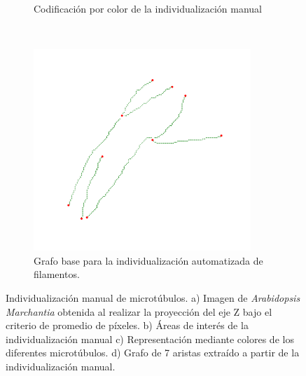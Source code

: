 \begin{figure}[h!]
\begin{subfigure}[t]{0.49\textwidth}
        \caption{Codificaci\'on por color de la individualizaci\'on manual}
        \label{fig:field3t0filtered2-indivManual}
    \end{subfigure}
    ~
    \begin{subfigure}[t]{0.49\textwidth}
        \centering
        \includegraphics[height=3in]{benchImages/field3-t0-2cellBcrop-filtered-2-graph-thick.png}
        \caption{Grafo base para la individualizaci\'on automatizada de filamentos.}
        \label{fig:field3t0filtered2-graph}
    \end{subfigure}
    \caption{Individualizaci\'on manual de microt\'ubulos. a) Imagen de {\it Arabidopsis Marchantia} obtenida al realizar la proyecci\'on del eje Z bajo el criterio de promedio de p\'ixeles. b) \'Areas de inter\'es de la individualizaci\'on manual c) Representaci\'on mediante colores de los diferentes microt\'ubulos. d) Grafo de 7 aristas extra\'ido a partir de la individualizaci\'on manual.}
    \label{fig:field3t0filtered2}
\end{figure}

